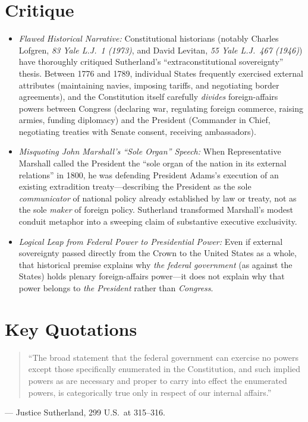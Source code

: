 \documentclass[12pt]{article}
\begin{document}
\section{Critique}
\begin{itemize}
  \item \textit{Flawed Historical Narrative:} Constitutional historians (notably Charles Lofgren, \textit{83 Yale L.J.\ 1 (1973)}, and David Levitan, \textit{55 Yale L.J.\ 467 (1946)}) have thoroughly critiqued Sutherland's ``extraconstitutional sovereignty'' thesis. Between 1776 and 1789, individual States frequently exercised external attributes (maintaining navies, imposing tariffs, and negotiating border agreements), and the Constitution itself carefully \textit{divides} foreign-affairs powers between Congress (declaring war, regulating foreign commerce, raising armies, funding diplomacy) and the President (Commander in Chief, negotiating treaties with Senate consent, receiving ambassadors).
  \item \textit{Misquoting John Marshall's ``Sole Organ'' Speech:} When Representative Marshall called the President the ``sole organ of the nation in its external relations'' in 1800, he was defending President Adams's execution of an existing extradition treaty---describing the President as the sole \textit{communicator} of national policy already established by law or treaty, not as the sole \textit{maker} of foreign policy. Sutherland transformed Marshall's modest conduit metaphor into a sweeping claim of substantive executive exclusivity.
  \item \textit{Logical Leap from Federal Power to Presidential Power:} Even if external sovereignty passed directly from the Crown to the United States as a whole, that historical premise explains why \textit{the federal government} (as against the States) holds plenary foreign-affairs power---it does not explain why that power belongs to \textit{the President} rather than \textit{Congress}.
\end{itemize}

\section{Key Quotations}
\begin{quote}
``The broad statement that the federal government can exercise no powers except those specifically enumerated in the Constitution, and such implied powers as are necessary and proper to carry into effect the enumerated powers, is categorically true only in respect of our internal affairs.''
\end{quote}
\noindent --- Justice Sutherland, 299 U.S.\ at 315--316.
\end{document}
